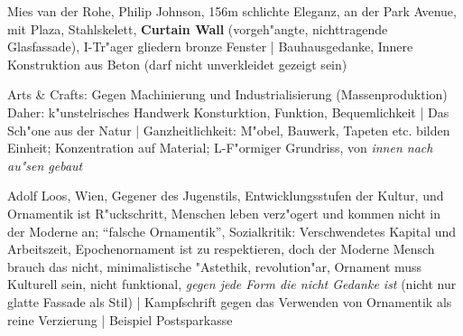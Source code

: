 \documentclass[emulatestandardclasses]{scrartcl}
\begin{document}
\begin{description}[leftmargin=!,labelwidth=\widthof{\bfseries P1}]
  \item[Seagrambuilding] Mies van der Rohe, Philip Johnson, 156m schlichte Eleganz, an der Park Avenue, mit Plaza, Stahlskelett, \textbf{Curtain Wall} (vorgeh"angte, nichttragende Glasfassade), I-Tr"ager gliedern bronze Fenster | Bauhausgedanke, Innere Konstruktion aus Beton (darf nicht unverkleidet gezeigt sein)
  \item[Red House] Arts \& Crafts: Gegen Machinierung und Industrialisierung (Massenproduktion) Daher: k"unstelrisches Handwerk Konsturktion, Funktion, Bequemlichkeit | Das Sch"one aus der Natur | Ganzheitlichkeit: M"obel, Bauwerk, Tapeten etc. bilden Einheit; Konzentration auf Material; L-F"ormiger Grundriss, von \emph{innen nach au"sen gebaut}
  \item[Ornament und Verbrechen] Adolf Loos, Wien, Gegener des Jugenstils, Entwicklungsstufen der Kultur, und Ornamentik ist R"uckschritt, Menschen leben verz"ogert und kommen nicht in der Moderne an; "`falsche Ornamentik"', Sozialkritik: Verschwendetes Kapital und Arbeitszeit, Epochenornament ist zu respektieren, doch der Moderne Mensch brauch das nicht, minimalistische "Astethik, revolution"ar, Ornament muss Kulturell sein, nicht funktional, \emph{gegen jede Form die nicht Gedanke ist} (nicht nur glatte Fassade als Stil) | Kampfschrift gegen das Verwenden von Ornamentik als reine Verzierung | Beispiel Postsparkasse


\end{description}
\end{document}
